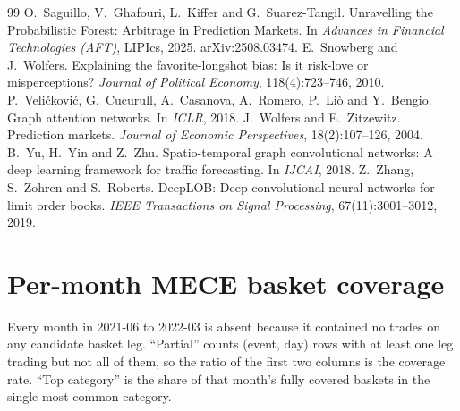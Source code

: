 \documentclass[11pt,a4paper]{article}
\begin{document}
\begin{thebibliography}{99}
 O.~Saguillo, V.~Ghafouri, L.~Kiffer and G.~Suarez-Tangil. Unravelling the Probabilistic Forest: Arbitrage in Prediction Markets. In \emph{Advances in Financial Technologies (AFT)}, LIPIcs, 2025. arXiv:2508.03474.
 E.~Snowberg and J.~Wolfers. Explaining the favorite-longshot bias: Is it risk-love or misperceptions? \emph{Journal of Political Economy}, 118(4):723--746, 2010.
 P.~Veli\v{c}kovi\'c, G.~Cucurull, A.~Casanova, A.~Romero, P.~Li\`o and Y.~Bengio. Graph attention networks. In \emph{ICLR}, 2018.
 J.~Wolfers and E.~Zitzewitz. Prediction markets. \emph{Journal of Economic Perspectives}, 18(2):107--126, 2004.
 B.~Yu, H.~Yin and Z.~Zhu. Spatio-temporal graph convolutional networks: A deep learning framework for traffic forecasting. In \emph{IJCAI}, 2018.
 Z.~Zhang, S.~Zohren and S.~Roberts. DeepLOB: Deep convolutional neural networks for limit order books. \emph{IEEE Transactions on Signal Processing}, 67(11):3001--3012, 2019.
\end{thebibliography}

\appendix
\section{Per-month MECE basket coverage}
\label{app:permonth}

Every month in 2021-06 to 2022-03 is absent because it contained no trades on
any candidate basket leg. ``Partial'' counts (event, day) rows with at least
one leg trading but not all of them, so the ratio of the first two columns is
the coverage rate. ``Top category'' is the share of that month's fully covered
baskets in the single most common category.
\end{document}
